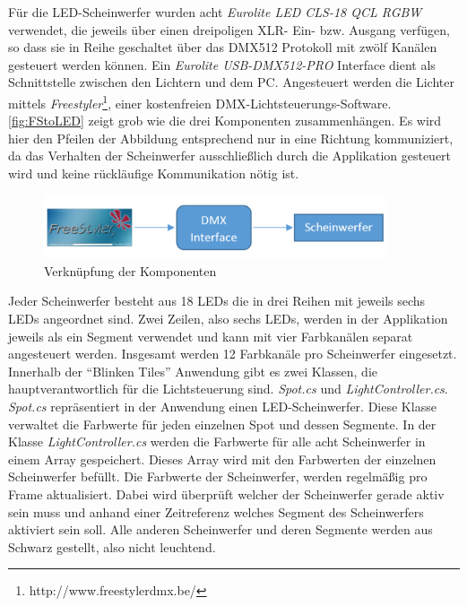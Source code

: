 
Für die LED-Scheinwerfer wurden acht \emph{Eurolite LED CLS-18 QCL RGBW} verwendet, die jeweils über einen dreipoligen XLR- Ein- bzw. Ausgang verfügen, so dass sie in Reihe geschaltet über das DMX512 Protokoll mit zwölf Kanälen gesteuert werden können. Ein \emph{Eurolite USB-DMX512-PRO} Interface dient als Schnittstelle zwischen den Lichtern und dem PC. Angesteuert werden die Lichter mittels \emph{Freestyler}\footnote{http://www.freestylerdmx.be/}, einer kostenfreien DMX-Lichtsteuerungs-Software. \autoref{fig:FStoLED} zeigt grob wie die drei Komponenten zusammenhängen. Es wird hier den Pfeilen der Abbildung entsprechend nur in eine Richtung kommuniziert, da das Verhalten der Scheinwerfer ausschließlich durch die Applikation gesteuert wird und keine rückläufige Kommunikation nötig ist.
\begin{figure}[h]
	\centering
		\includegraphics[width=0.90\textwidth]{images/FStoDMXInterfaceToLEDs.PNG}
	\caption{Verknüpfung der Komponenten}
	\label{fig:FStoLED}
\end{figure}
Jeder Scheinwerfer besteht aus 18 LEDs die in drei Reihen mit jeweils sechs LEDs angeordnet sind. Zwei Zeilen, also sechs LEDs, werden in der Applikation jeweils als ein Segment verwendet und  kann mit vier Farbkanälen separat angesteuert werden. Insgesamt werden 12 Farbkanäle pro Scheinwerfer eingesetzt. Innerhalb der "`Blinken Tiles"' Anwendung gibt es zwei Klassen, die hauptverantwortlich für die Lichtsteuerung sind. \emph{Spot.cs} und \emph{LightController.cs}. \emph{Spot.cs} repräsentiert in der Anwendung einen LED-Scheinwerfer. Diese Klasse verwaltet die Farbwerte für jeden einzelnen Spot und dessen Segmente. In der Klasse \emph{LightController.cs} werden die Farbwerte für alle acht Scheinwerfer in einem Array gespeichert. Dieses Array wird mit den Farbwerten der einzelnen Scheinwerfer befüllt. Die Farbwerte der Scheinwerfer, werden regelmäßig pro Frame aktualisiert. Dabei wird überprüft welcher der Scheinwerfer gerade aktiv sein muss und anhand einer Zeitreferenz welches Segment des Scheinwerfers aktiviert sein soll. Alle anderen Scheinwerfer und deren Segmente werden aus Schwarz gestellt, also nicht leuchtend. 
